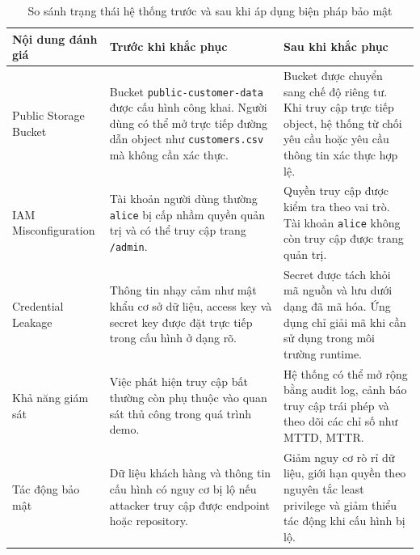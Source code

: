 \begin{table}[H]
\centering
\caption{So sánh trạng thái hệ thống trước và sau khi áp dụng biện pháp bảo mật}
\label{tab:before-after-security}
\renewcommand{\arraystretch}{1.35}
\begin{tabular}{|p{3.2cm}|p{5.4cm}|p{5.4cm}|}
\hline
\textbf{Nội dung đánh giá} & \textbf{Trước khi khắc phục} & \textbf{Sau khi khắc phục} \\
\hline
Public Storage Bucket &
Bucket \texttt{public-customer-data} được cấu hình công khai. Người dùng có thể mở trực tiếp đường dẫn object như \texttt{customers.csv} mà không cần xác thực. &
Bucket được chuyển sang chế độ riêng tư. Khi truy cập trực tiếp object, hệ thống từ chối yêu cầu hoặc yêu cầu thông tin xác thực hợp lệ. \\
\hline
IAM Misconfiguration &
Tài khoản người dùng thường \texttt{alice} bị cấp nhầm quyền quản trị và có thể truy cập trang \texttt{/admin}. &
Quyền truy cập được kiểm tra theo vai trò. Tài khoản \texttt{alice} không còn truy cập được trang quản trị. \\
\hline
Credential Leakage &
Thông tin nhạy cảm như mật khẩu cơ sở dữ liệu, access key và secret key được đặt trực tiếp trong cấu hình ở dạng rõ. &
Secret được tách khỏi mã nguồn và lưu dưới dạng đã mã hóa. Ứng dụng chỉ giải mã khi cần sử dụng trong môi trường runtime. \\
\hline
Khả năng giám sát &
Việc phát hiện truy cập bất thường còn phụ thuộc vào quan sát thủ công trong quá trình demo. &
Hệ thống có thể mở rộng bằng audit log, cảnh báo truy cập trái phép và theo dõi các chỉ số như MTTD, MTTR. \\
\hline
Tác động bảo mật &
Dữ liệu khách hàng và thông tin cấu hình có nguy cơ bị lộ nếu attacker truy cập được endpoint hoặc repository. &
Giảm nguy cơ rò rỉ dữ liệu, giới hạn quyền theo nguyên tắc least privilege và giảm thiểu tác động khi cấu hình bị lộ. \\
\hline
\end{tabular}
\end{table}
